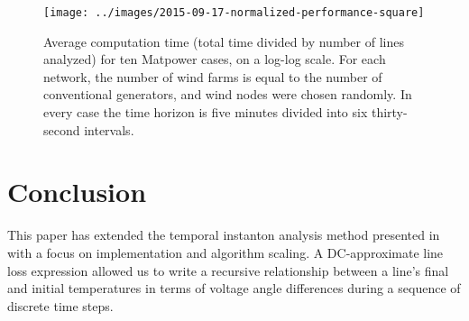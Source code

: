 \documentclass[journal,twoside]{IEEEtran}
\begin{document}
\begin{figure}
\centering
\texttt{[image: ../images/2015-09-17-normalized-performance-square]}
\caption{Average computation time (total time divided by number of lines analyzed) for ten Matpower cases, on a log-log scale. For each network, the number of wind farms is equal to the number of conventional generators, and wind nodes were chosen randomly. In every case the time horizon is five minutes divided into six thirty-second intervals.}
\label{fig:normalized-performance}
\end{figure}


\section{Conclusion}\label{sec:conclusion}
This paper has extended the temporal instanton analysis method presented in \cite{kersulis2015} with a focus on implementation and algorithm scaling. A DC-approximate line loss expression allowed us to write a recursive relationship between a line's final and initial temperatures in terms of voltage angle differences during a sequence of discrete time steps.




%
%
\end{document}
